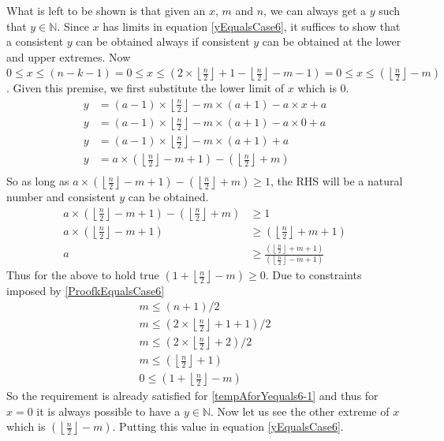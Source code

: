 \documentclass[10pt, twoside]{article}
\newcommand{\floordivision}[2]{\left\lfloor \frac{#1}{#2} \right\rfloor}
\begin{document}
What is left to be shown is that given an $x$, $m$ and $n$, we can always get a $y$ such that $y \in \mathbb{N}$. Since $x$ has limits in equation \eqref{yEqualsCase6}, it suffices to show that a consistent $y$ can be obtained always if consistent $y$ can be obtained at the lower and upper extremes.\newline
Now $0 \leq x \leq (n-k-1) = 0 \leq x \leq (2\times \floordivision{n}{2}+1-\floordivision{n}{2}-m-1) = 0 \leq x \leq (\floordivision{n}{2} -m)$. Given this premise, we first substitute the lower limit of $x$ which is $0$.
\begin{align*}
	y &= (a-1)\times \floordivision{n}{2} -m\times(a+1) - a\times x + a \\
	y &= (a-1)\times \floordivision{n}{2} -m\times(a+1) - a\times 0 + a \\
	y &= (a-1)\times \floordivision{n}{2} -m\times(a+1) + a \\
	y &= a\times(\floordivision{n}{2}-m+1) - (\floordivision{n}{2}+m) \\
\end{align*}
So as long as $a\times(\floordivision{n}{2}-m+1) - (\floordivision{n}{2}+m) \geq 1$, the RHS will be a natural number and consistent $y$ can be obtained.
\begin{align}
	a\times(\floordivision{n}{2}-m+1) - (\floordivision{n}{2}+m) &\geq 1 \nonumber \\
	a\times(\floordivision{n}{2}-m+1) &\geq (\floordivision{n}{2}+m+1) \nonumber \\
	a &\geq \frac{(\floordivision{n}{2}+m+1)}{(\floordivision{n}{2}-m+1)} \label{tempAforYequals6-1}
\end{align}
Thus for the above to hold true $(1+\floordivision{n}{2}-m) \geq 0$.\newline
Due to constraints imposed by \eqref{ProofkEqualsCase6} 
\begin{align*}
	m \leq (n+1)/2 \\
	m \leq (2\times \floordivision{n}{2} + 1 +1)/2 \\
	m \leq (2\times \floordivision{n}{2} + 2)/2 \\
	m \leq (\floordivision{n}{2}+1) \\
	0 \leq (1+\floordivision{n}{2}-m)
\end{align*}
So the requirement is already satisfied for \eqref{tempAforYequals6-1} and thus for $x=0$ it is always possible to have a $y \in \mathbb{N}$. Now let us see the other extreme of $x$ which is $(\floordivision{n}{2}-m)$. Putting this value in equation \eqref{yEqualsCase6}.
\end{document}
